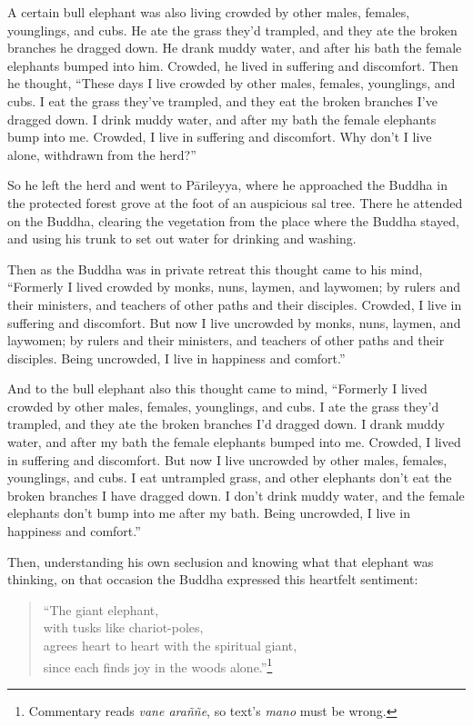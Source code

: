 \documentclass[12pt,openany]{book}%
\begin{document}
A certain bull elephant was also living crowded by other males, females, younglings, and cubs. He ate the grass they’d trampled, and they ate the broken branches he dragged down. He drank muddy water, and after his bath the female elephants bumped into him. Crowded, he lived in suffering and discomfort. Then he thought, “These days I live crowded by other males, females, younglings, and cubs. I eat the grass they’ve trampled, and they eat the broken branches I’ve dragged down. I drink muddy water, and after my bath the female elephants bump into me. Crowded, I live in suffering and discomfort. Why don’t I live alone, withdrawn from the herd?” 

So he left the herd and went to \textsanskrit{Pārileyya}, where he approached the Buddha in the protected forest grove at the foot of an auspicious sal tree. There he attended on the Buddha, clearing the vegetation from the place where the Buddha stayed, and using his trunk to set out water for drinking and washing. 

Then as the Buddha was in private retreat this thought came to his mind, “Formerly I lived crowded by monks, nuns, laymen, and laywomen; by rulers and their ministers, and teachers of other paths and their disciples. Crowded, I live in suffering and discomfort. But now I live uncrowded by monks, nuns, laymen, and laywomen; by rulers and their ministers, and teachers of other paths and their disciples. Being uncrowded, I live in happiness and comfort.” 

And to the bull elephant also this thought came to mind, “Formerly I lived crowded by other males, females, younglings, and cubs. I ate the grass they’d trampled, and they ate the broken branches I’d dragged down. I drank muddy water, and after my bath the female elephants bumped into me. Crowded, I lived in suffering and discomfort. But now I live uncrowded by other males, females, younglings, and cubs. I eat untrampled grass, and other elephants don’t eat the broken branches I have dragged down. I don’t drink muddy water, and the female elephants don’t bump into me after my bath. Being uncrowded, I live in happiness and comfort.” 

Then, understanding his own seclusion and knowing what that elephant was thinking, on that occasion the Buddha expressed this heartfelt sentiment: 

\begin{verse}%
“The giant elephant, \\
with tusks like chariot-poles, \\
agrees heart to heart with the spiritual giant, \\
since each finds joy in the woods alone.”\footnote{Commentary reads \textit{vane \textsanskrit{araññe}}, so text’s \textit{mano} must be wrong. } 

%
\end{verse}
\end{document}
